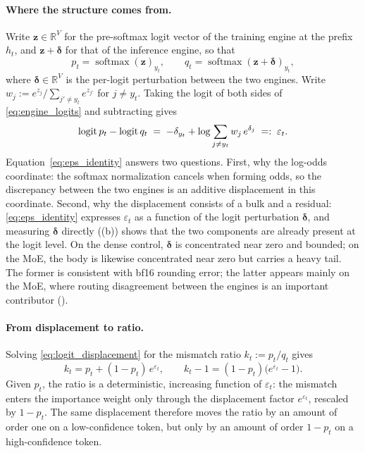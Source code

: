 \paragraph{Where the structure comes from.}
Write $\mathbf z\in\mathbb{R}^{V}$ for the pre-softmax logit vector of the
training engine at the prefix $h_t$, and $\mathbf z+\boldsymbol\delta$ for that
of the inference engine, so that
\begin{equation}
p_t=\operatorname{softmax}(\mathbf z)_{y_t},
\qquad
q_t=\operatorname{softmax}(\mathbf z+\boldsymbol\delta)_{y_t},
\label{eq:engine_logits}
\end{equation}
where $\boldsymbol\delta\in\mathbb{R}^{V}$ is the per-logit perturbation between
the two engines. Write $w_j:=e^{z_j}\big/\sum_{j'\ne y_t}e^{z_{j'}}$ for
$j\ne y_t$. Taking the logit of both sides of \eqref{eq:engine_logits} and
subtracting gives
\begin{equation}
\operatorname{logit} p_t-\operatorname{logit} q_t
\;=\;
-\delta_{y_t}+\log\sum_{j\ne y_t} w_j\,e^{\delta_j}
\;=:\;
\varepsilon_t .
\label{eq:eps_identity}
\end{equation}
Equation~\eqref{eq:eps_identity} answers two questions. First, why the log-odds
coordinate: the softmax normalization cancels when forming odds, so the
discrepancy between the two engines is an additive displacement in this
coordinate. Second, why the displacement consists of a bulk and a residual:
\eqref{eq:eps_identity} expresses $\varepsilon_t$ as a function of the logit
perturbation $\boldsymbol\delta$, and measuring $\boldsymbol\delta$ directly
((b)) shows that the two components are already present at
the logit level. On the dense control, $\boldsymbol\delta$ is concentrated near
zero and bounded; on the MoE, the body is likewise concentrated near zero but
carries a heavy tail. The former is consistent with bf16 rounding error; the
latter appears mainly on the MoE, where routing disagreement between the engines
is an important contributor ().

\paragraph{From displacement to ratio.}
Solving \eqref{eq:logit_displacement} for the mismatch ratio $k_t:=p_t/q_t$
gives
\begin{equation}
k_t=p_t+(1-p_t)\,e^{\varepsilon_t},
\qquad
k_t-1=(1-p_t)\big(e^{\varepsilon_t}-1\big).
\label{eq:k_geometry}
\end{equation}
Given $p_t$, the ratio is a deterministic, increasing function of
$\varepsilon_t$: the mismatch enters the importance weight only through the
displacement factor $e^{\varepsilon_t}$, rescaled by $1-p_t$. The same
displacement therefore moves the ratio by an amount of order one on a
low-confidence token, but only by an amount of order $1-p_t$ on a
high-confidence token.
